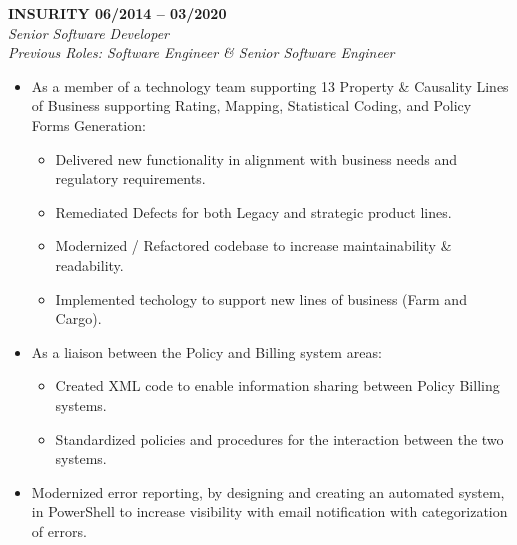 


\begin{cvparagraph}

{\normalsize \textbf{ INSURITY \hfill 06/2014 -- 03/2020}} \\
{\sl Senior Software Developer} \\
{\sl Previous Roles: Software Engineer \& Senior Software Engineer} \\

\begin{itemize}
   \item As a member of a technology team supporting 13 Property \& Causality
      Lines of Business supporting Rating, Mapping, Statistical Coding, and Policy 
      Forms Generation:
   \begin{itemize}
      \item Delivered new functionality in alignment with business needs and 
         regulatory requirements.
      \item Remediated Defects for both Legacy and strategic product lines. 
      \item Modernized / Refactored codebase to increase maintainability \& 
         readability.
      \item Implemented techology to support new lines of business (Farm and Cargo).
   \end{itemize}

   \item As a liaison between the Policy and Billing system areas:
   \begin{itemize}
      \item Created XML code to enable information sharing between Policy Billing 
         systems.
      \item Standardized policies and procedures for the interaction between the 
         two systems.
   \end{itemize}

   \item Modernized error reporting, by designing and creating an automated system, 
      in PowerShell to increase visibility with email notification with categorization
      of errors.


\end{itemize}
\end{cvparagraph}

